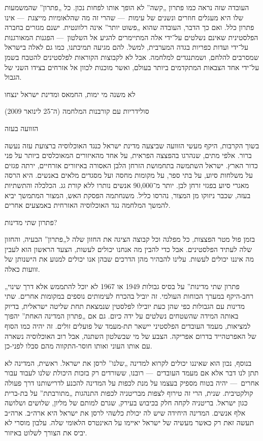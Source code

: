 העובדה שזה נראה כמו פתרון „קשה” לא הופך אותו לפחות נכון. כל „פתרון” שהמשמעות שלו היא מעגלים חוזרים ונשנים של עימות~— שהרי זה מה שהלאומיות מייצגת~— אינו פתרון כלל. ואם כך הדבר, העובדה שהוא „פשוט יותר” אינה רלוונטית. ישנם מגזרים בחברה הפלסטינית שאינם נשלטים על־ידי אלה המתיימרים להגיע אל השלטון~— הפגנות המאורגנות על־ידי ועדות כפריות בגדה המערבית, למשל. להם מגיעה תמיכתנו, כמו גם לאלה בישראל שמסרבים להלחם, ושמתנגדים למלחמה. אבל לא לקבוצות הקוראות לפלסטינים להטבח בשמן על־ידי אחד הצבאות המתקדמים ביותר בעולם, ואשר מוכנות לכוון אל אזרחים בצידו השני של הגבול.

לא משנה מי ימות, החמאס ומדינת ישראל ינצחו

סולידריות עם קורבנות המלחמה (ה־25 לינואר 2009)

הזוועה בעזה

בשוך הקרבות, היקף מעשי הזוועה שביצעה מדינת ישראל כנגד האוכלוסיה ברצועת עזה נעשה ברור. אלפי מתים, שנהרגו בהפצצה הפראית, על אחד מהאיזורים המאוכלסים ביותר על פני כדור הארץ. ישראל השתמשה בתחמושת הזרחן הלבן האסורה באיזורים אזרחיים, ירתה פגזים על משלחות סיוע, על בתי ספר, על מקומות מחסה ועל מסגדים מלאים באנשים. היא הרסה מאגרי סיוע בפגזי זרחן לבן. יותר מ־90,000 אנשים נותרו ללא קורת גג. הכלכלה והתשתיות בעזה, שכבר ניזוקו מן המצור, נהרסו כליל. משנחתמה הפסקת האש, המצור המתמשך יביא להמשך המלחמה נגד האוכלוסיה האזרחית באמצעים אחרים.

פתרון שתי מדינות?

בזמן פול מטר הפצצות, כל מפלגה וכל קבוצה הציגה את החזון שלה ל„פתרון” הבעיה, והחזון שלה לעתיד הפלסטינים. אבל כדי להבין מה אנחנו יכולים לעשות, הצעד הראשון הוא לעבין מה איננו יכולים לעשות. עלינו להבהיר מהן הדרכים שבהן אנו יכולים למנוע את הישנותן של זוועות כאלה.

„פתרון שתי מדינות” על בסיס גבולות 1949 או 1967 לא יוכל להתממש אלא דרך שינוי רחב-היקף במערך הכוחות העולמי. זה יוביל בהכרח לעימותים נוספים במקומות אחרים. שתי מדינות עם הגבולות כפי שהן כעת יובילו לפלסטין שנמצאת תחת שליטה ישראלית, בדיוק באותה המידה שהשטחים נשלטים על ידה כיום. גם אם „פתרון המדינה האחת” יהפוך למציאות, מעמד העובדים הפלסטיני יישאר תת-מעמד של פועלים זולים. זה יהיה כמו הסוף של האפרטהייד בדרום אפריקה. הצבע של מי שבשלטון השתנה, אבל רוב האוכלוסיה נשארה עם אותו העוני ואותו חוסר-התקווה מהם סבלו לפני-כן.

בנוסף, נכון הוא שאיננו יכולים לקרוא למדינה „שלנו” לרסן את ישראל. ראשית, המדינה לא תתן לנו דבר אלא אם מעמד העובדים~— רובנו, ששורדים רק בזכות היכולת שלנו לעבוד עבור אחרים~— יהיה בטוח מספיק בעצמו על מנת לכפות על המדינה להכנע לדרישותנו דרך פעולה קולקטיבית. שנית, הרי זה טירוף לצפות מבריטניה לכפות התנהגות „מתורבתת” על בת-ברית כגון ישראל. בריטניה לקחה חלק בכיבוש בעירק, שגרם למותם של מליון, שלושים ושלושה אלף אנשים. המדינה היחידה שיש לה יכולת כלשהי לרסן את ישראל היא ארה״ב. ארה״ב תעשה זאת רק כאשר מעשיה של ישראל יאיימו על האינטרס הלאומי שלה. עלבון מוסרי לא יביס את הצורך לשלוט באיזור.

